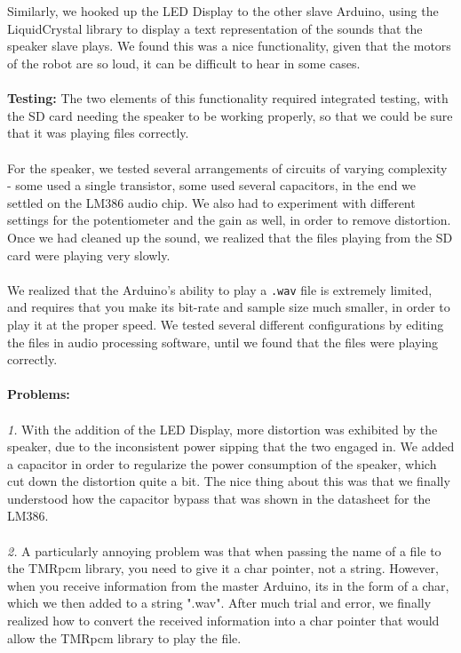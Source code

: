 \documentclass[paper=a4, fontsize=11pt]{scrartcl}
\numberwithin{equation}{section}		%
\numberwithin{figure}{section}			%
\numberwithin{table}{section}				%
\begin{document}
{\\\\
Similarly, we hooked up the LED Display to the other slave Arduino, using the LiquidCrystal library to display a text representation of the sounds that the speaker slave plays. We found this was a nice functionality, given that the motors of the robot are so loud, it can be difficult to hear in some cases.
\\\\
\textbf{Testing: } The two elements of this functionality required integrated testing, with the SD card needing the speaker to be working properly, so that we could be sure that it was playing files correctly. 
\\\\
For the speaker, we tested several arrangements of circuits of varying complexity - some used a single transistor, some used several capacitors, in the end we settled on the LM386 audio chip. We also had to experiment with different settings for the potentiometer and the gain as well, in order to remove distortion. Once we had cleaned up the sound, we realized that the files playing from the SD card were playing very slowly.
\\\\
We realized that the Arduino's ability to play a \texttt{.wav} file is extremely limited, and requires that you make its bit-rate and sample size much smaller, in order to play it at the proper speed. We tested several different configurations by editing the files in audio processing software, until we found that the files were playing correctly.
\\\\
\textbf{Problems: }\\\\
\textit{1. }With the addition of the LED Display, more distortion was exhibited by the speaker, due to the inconsistent power sipping that the two engaged in. We added a capacitor in order to regularize the power consumption of the speaker, which cut down the distortion quite a bit. The nice thing about this was that we finally understood how the capacitor bypass that was shown in the datasheet for the LM386.
\\\\
\textit{2. }A particularly annoying problem was that when passing the name of a file to the TMRpcm library, you need to give it a char pointer, not a string. However, when you receive information from the master Arduino, its in the form of a char, which we then added to a string ".wav". After much trial and error, we finally realized how to convert the received information into a char pointer that would allow the TMRpcm library to play the file.
}
\end{document}
